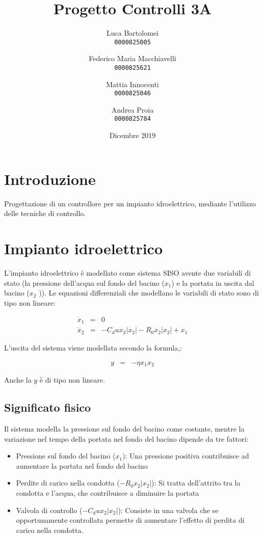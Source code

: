 \documentclass{article}
\title{Progetto Controlli 3A}
\author{
Luca Bartolomei\\
\texttt{0000825005}
\and
Federico Maria Macchiavelli\\
\texttt{0000825621}
\and
Mattia Innocenti\\
\texttt{0000825046}
\and
Andrea Proia\\
\texttt{0000825784}}
\date{Dicembre 2019}
\begin{document}
\maketitle

\section{Introduzione}

Progettazione di un controllore per un impianto idroelettrico, mediante l'utilizzo delle tecniche di controllo.

\section{Impianto idroelettrico}

L'impianto idroelettrico è modellato come sistema SISO avente due variabili di stato (la pressione  dell’acqua sul fondo del bacino ($x_1$) e la portata in uscita dal bacino ($x_2$ )). Le equazioni differenziali che modellano le variabili di stato sono di tipo non lineare:

$$
\begin{array}{lcl}
    \dot{x}_1 & = & 0 \\
    \dot{x}_2 & = & -C_d u x_2 |x_2| -R_0 x_2 |x_2| + x_1
\end{array}
$$

L'uscita del sistema viene modellata secondo la formula,:

$$
\begin{array}{lcl}
    y & = & -\eta x_1 x_2
\end{array}
$$

Anche la $y$ è di tipo non lineare.

\subsection{Significato fisico}

Il sistema modella la pressione sul fondo del bacino come costante, mentre la variazione nel tempo della portata nel fondo del bacino dipende da tre fattori:

\begin{itemize}
    \item Pressione sul fondo del bacino ($x_1$): Una pressione positiva contribuisce ad aumentare la portata nel fondo del bacino
    \item Perdite di carico nella condotta ($-R_0 x_2 |x_2|$): Si tratta dell'attrito tra la condotta e l'acqua, che contribuisce a diminuire la portata
    \item Valvola di controllo ($-C_d u x_2 |x_2|$): Consiste in una valvola che se opportunamente controllata permette di aumentare l'effetto di perdita di carico nella condotta.
\end{itemize}
\end{document}
